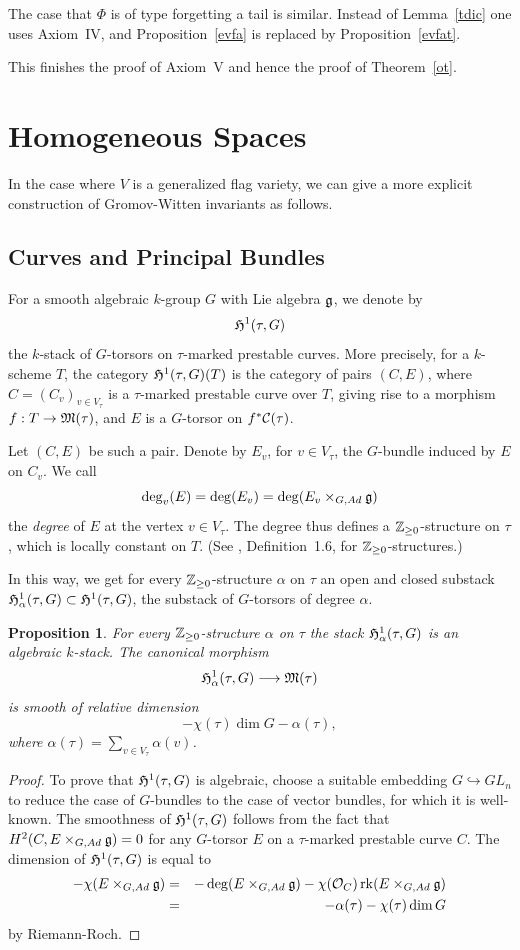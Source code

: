 \documentclass{article}
\newtheorem{prop}{Proposition}
\newcommand{\upst}{^{\ast}}
\newcommand{\MM}{{\frak M}}
\newcommand{\HH}{{\frak H}}
\newcommand{\Gg}{{\frak g}}
\newcommand{\zz}{{\Bbb Z}}
\renewcommand{\O}{{\cal O}}
\newcommand{\cC}{{\cal C}}
\newcommand{\rk}{\mathop{\rm rk}}
\renewcommand{\t}{_{\tau}}
\begin{document}
The case that $\Phi$ is of type forgetting a tail is similar. Instead
of Lemma~\ref{tdic} one uses Axiom~IV, and Proposition~\ref{evfa} is
replaced by Proposition~\ref{evfat}.

This finishes the proof of
Axiom~V and hence the proof of Theorem~\ref{ot}.

\section{Homogeneous Spaces}

In the case where $V$ is a generalized flag variety, we can give a
more explicit construction of Gromov-Witten invariants as follows.

\subsection{Curves and Principal Bundles}

For a smooth algebraic $k$-group $G$ with Lie algebra $\Gg$, we denote
by
\[\HH^1(\tau,G)\]
the $k$-stack of $G$-torsors on $\tau$-marked prestable curves. More
precisely, for a $k$-scheme $T$, the category
$\HH^1(\tau,G)(T)$ is the category of pairs $(C,E)$,
where $C=(C_v)_{v\in V\t}$ is a $\tau$-marked prestable curve over
$T$, giving rise to a morphism $f:T\rightarrow\MM(\tau)$, and $E$ is a
$G$-torsor on $f\upst\cC(\tau)$.

Let $(C,E)$ be such a pair. Denote by $E_v$, for $v\in V\t$, the
$G$-bundle induced by $E$ on $C_v$. We call
\[\deg_v(E)=\deg(E_v)=\deg(E_v\times_{G,Ad}\Gg)\]
the {\em degree }of $E$ at the vertex $v\in V\t$. The degree thus
defines a $\zz_{\geq0}$-structure on $\tau$, which is locally constant
on $T$. (See \cite{BM}, Definition~1.6, for $\zz_{\geq0}$-structures.)

In this way, we get for every $\zz_{\geq0}$-structure $\alpha$ on
$\tau$ an open and closed substack
$\HH^1_{\alpha}(\tau,G)
\subset\HH^1(\tau,G)$,
the substack of $G$-torsors of degree $\alpha$.

\begin{prop} \label{h1sd}
For every $\zz_{\geq0}$-structure $\alpha$ on $\tau$ the stack
$\HH^1_{\alpha}(\tau,G)$ is an algebraic $k$-stack.
The canonical morphism
\[\HH^1_{\alpha}(\tau,G)\longrightarrow\MM(\tau)\]
is smooth of relative dimension
\[-\chi(\tau)\dim G-\alpha(\tau),\]
where $\alpha(\tau)=\sum_{v \in V\t}\alpha(v)$.
\end{prop}
\begin{proof}
To prove that $\HH^1(\tau,G)$ is algebraic, choose a suitable
embedding $G\hookrightarrow GL_n$ to reduce the case of $G$-bundles to the
case of vector bundles, for which it is well-known. The smoothness of
$\HH^1(\tau,G)$ follows from the fact that
$H^2(C,E\times_{G,Ad}\Gg)=0$ for any $G$-torsor $E$ on a $\tau$-marked
prestable curve $C$. The dimension of $\HH^1(\tau,G)$ is equal to
\begin{eqnarray*}
-\chi(E\times_{G,Ad}\Gg)& = &
-\deg(E\times_{G,Ad}\Gg)-\chi(\O_C)\rk(E\times_{G,Ad}\Gg) \\
&=& -\alpha(\tau)-\chi(\tau)\dim G
\end{eqnarray*}
by Riemann-Roch.
\end{proof}
\end{document}
